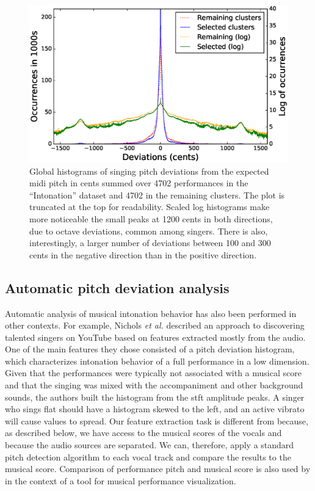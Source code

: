 \begin{figure}[h!]
    \centering
    \includegraphics[width=\textwidth]{figures/full_histograms_comparison.eps}
    \caption{Global histograms of singing pitch deviations from the expected \gls{midi} pitch in cents summed over 4702 performances in the ``Intonation'' dataset and 4702 in the remaining clusters. The plot is truncated at the top for readability. Scaled log histograms make more noticeable the small peaks at 1200 cents in both directions, due to octave deviations, common among singers. There is also, interestingly, a larger number of deviations between 100 and 300 cents in the negative direction than in the positive direction.}
    \label{fig:full_hist}
\end{figure}

\subsection{Automatic pitch deviation analysis}
Automatic analysis of musical intonation behavior has also been performed in other contexts. For example, Nichols \textit{et al.} \cite{nichols2012automatically} described an approach to discovering talented singers on YouTube based on features extracted mostly from the audio. One of the main features they chose consisted of a pitch deviation histogram, which characterizes intonation behavior of a full performance in a low dimension. Given that the performances were typically not associated with a musical score and that the singing was mixed with the accompaniment and other background sounds, the authors built the histogram from the \gls{stft} amplitude peaks. A singer who sings flat should have a histogram skewed to the left, and an active vibrato will cause values to spread. Our feature extraction task is different from \cite{nichols2012automatically} because, as described below, we have access to the musical scores of the vocals and because the audio sources are separated. We can, therefore, apply a standard pitch detection algorithm to each vocal track and compare the results to the musical score. Comparison of performance pitch and musical score is also used by \cite{lim2010intune} in the context of a tool for musical performance visualization.


